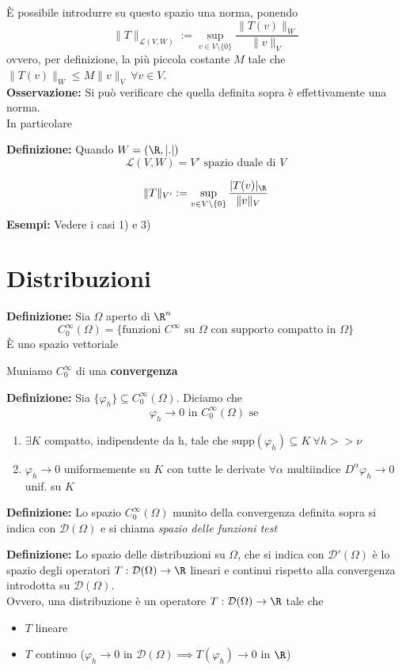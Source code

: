È possibile introdurre su questo spazio una norma, ponendo 
\[\|T\|_{\mathcal L(V,W)}:=\sup_{v\in V\setminus \{0\} }\frac{\|T(v)\|_W}{\|v\|_V}\]
ovvero, per definizione, la più piccola costante $M$ tale che $\|T(v)\|_W\le M \|v\|_V\ \forall v\in V$.
\\\textbf{Osservazione:} Si può verificare che quella definita sopra è effettivamente una norma.\\
In particolare
\begin{tcolorbox}
	\textbf{Definizione: }Quando $W=(\R,|.|)$ 
	\[\mathcal L (V,W)=V'\text{ spazio duale di }V\]
\end{tcolorbox}
\[\|T\|_{V'}:=\sup_{v\in V\setminus \{0\} } \frac{|T(v)|_{\R}}{\|v\|_V}\]
\textbf{Esempi: }Vedere i casi 1) e 3)


\section{Distribuzioni}
\begin{tcolorbox}
\textbf{Definizione: }Sia $\Omega$ aperto di $\R^n$ 
\[C_0^\infty(\Omega)=\{\text{funzioni }C^\infty\text{ su }\Omega\text{ con supporto compatto in }\Omega\}\]
È uno spazio vettoriale
\end{tcolorbox}
Muniamo $C_0^\infty$ di una \textbf{convergenza} 
\begin{tcolorbox}
	\textbf{Definizione: }Sia $\{\varphi_h\} \subseteq  C_0^\infty(\Omega)$. Diciamo che 
	\[\varphi_h\to 0\text{ in }C_0^\infty(\Omega)\text{ se }\]
\begin{enumerate}
	\item $\exists K$ compatto, indipendente da h, tale che $\text{supp}(\varphi_h)\subseteq  K\ \forall h> >\nu$
	\item $\varphi_h\to 0$ uniformemente su $K$ con tutte le derivate $\forall \alpha$ multiindice $D^\alpha\varphi_h\to 0$ unif. su $K$
\end{enumerate}
\end{tcolorbox}
\begin{tcolorbox}
	\textbf{Definizione: }Lo spazio $C_0^\infty(\Omega)$ munito della convergenza definita sopra si indica con $\mathcal D(\Omega)$ e si chiama \emph{spazio delle funzioni test}
\end{tcolorbox}
\begin{tcolorbox}
	\textbf{Definizione: }Lo spazio delle distribuzioni su $\Omega $, che si indica con $\mathcal D'(\Omega)$ è lo spazio degli operatori $T:\mathcal D(\Omega)\to \R$ lineari e continui rispetto alla convergenza introdotta su $\mathcal D(\Omega)$.\\Ovvero, una distribuzione è un operatore $T:\mathcal D(\Omega)\to \R$ tale che 
	\begin{itemize}
		\item $T$ lineare
		\item $T$ continuo ($\varphi_h\to 0$ in $\mathcal D(\Omega)\implies T(\varphi_h)\to 0$ in $\R$)
	\end{itemize}
\end{tcolorbox}
